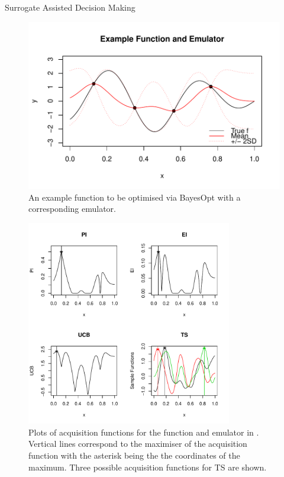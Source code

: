 \begin{chapter}{Surrogate Assisted Decision Making \label{Chap:optimisation}}
\begin{figure}[h]
  \centering
  \includegraphics[width=\textwidth]{fig-optim/example-fn.pdf}
  \caption{An example function to be optimised via BayesOpt with a corresponding emulator.}
  \label{Fig:example-fn}
\end{figure}
\begin{figure}[h]
  \centering
  \includegraphics[width=0.8\textwidth]{fig-optim/classic-acquisition.pdf}
  \caption{Plots of acquisition functions for the function and emulator in . Vertical lines correspond to the maximiser of the acquisition function with the asterisk being the the coordinates of the maximum. Three possible acquisition functions for TS are shown.}
  \label{Fig:acq-fns}
\end{figure}

\end{chapter}
